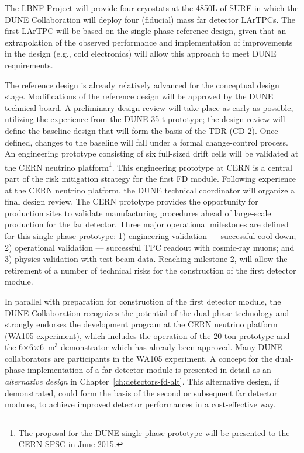The LBNF Project will provide four cryostats at the 4850L of SURF in which the DUNE Collaboration
will deploy four  (fiducial) mass far detector LArTPCs.
The first  LArTPC will be based on
the single-phase reference design, given that an
extrapolation of the observed performance and implementation of
improvements in the design (e.g., cold electronics) will allow this approach to meet DUNE requirements.



The reference design is already relatively advanced for  the %
conceptual design %
stage. Modifications of the reference design will
be approved by the DUNE technical board. A preliminary design
review will take place as early as possible, utilizing the experience
from the DUNE 35-t prototype; the design review will define the
baseline design that will form the basis of the TDR (CD-2).  Once
defined, changes to the baseline will fall under a formal
change-control process. An engineering prototype consisting of
six full-sized drift cells will be validated at the CERN neutrino
platform\footnote{The proposal for the DUNE single-phase prototype
  will be presented to the CERN SPSC in June 2015.}.  This engineering
prototype at CERN is a central part of the risk mitigation strategy
for the first  FD module. Following experience at the CERN
neutrino platform, the DUNE technical coordinator will organize a
final design review. The CERN prototype provides the opportunity for
production sites to validate manufacturing procedures ahead of
large-scale production for the far detector. Three major operational
milestones are defined for this single-phase prototype: 1) engineering
validation --- successful cool-down; 2) operational validation ---
successful TPC readout with cosmic-ray muons; and 3) physics
validation with test beam data. Reaching milestone 2, will allow the
retirement of a number of technical risks for the construction of the
first  detector module.

In parallel with preparation for construction of the first 
detector module, the DUNE Collaboration recognizes the potential of
the dual-phase technology and strongly endorses the development
program at the CERN neutrino platform (WA105 experiment), which
includes the operation of the 20-ton prototype and the
6$\times$6$\times$6~m$^3$ demonstrator which has already been
approved. Many DUNE collaborators are participants in the WA105
experiment. A concept for the dual-phase implementation of a far detector module
is presented in detail as an \textit{alternative design} in
Chapter~\ref{ch:detectors-fd-alt}. This alternative design, if
demonstrated, could form the basis of the second or subsequent 
far detector modules, to achieve improved detector performances in a
cost-effective way.

